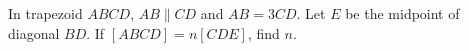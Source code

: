 In trapezoid $ABCD$, $AB\parallel CD$ and $AB=3CD$. Let $E$ be the midpoint of diagonal $BD$. If $[ABCD]=n[CDE]$, find $n$.
